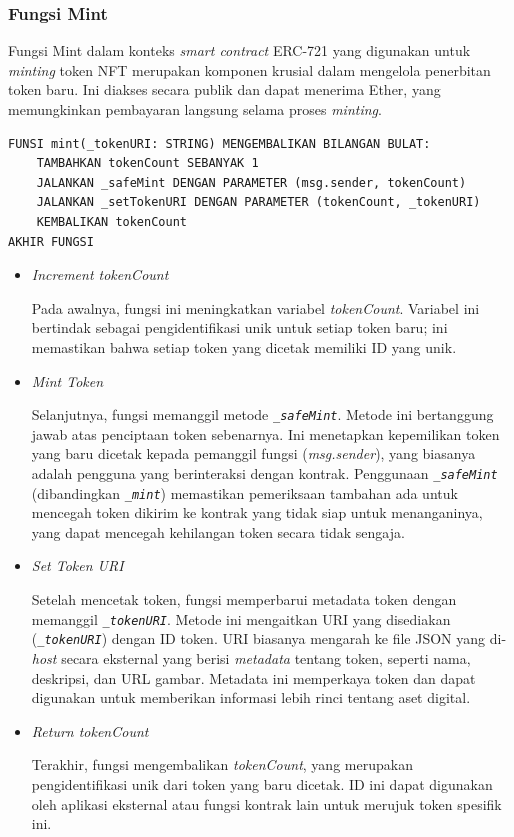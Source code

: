 \subsubsection{Fungsi Mint}
Fungsi Mint dalam konteks \emph{smart contract } ERC-721 yang digunakan untuk \emph{minting} token NFT merupakan komponen krusial dalam mengelola penerbitan token baru. Ini diakses secara publik dan dapat menerima Ether, yang memungkinkan pembayaran langsung selama proses \emph{minting}.

\begin{lstlisting}[caption=Fungsi Mint]
FUNSI mint(_tokenURI: STRING) MENGEMBALIKAN BILANGAN BULAT:
    TAMBAHKAN tokenCount SEBANYAK 1
    JALANKAN _safeMint DENGAN PARAMETER (msg.sender, tokenCount)
    JALANKAN _setTokenURI DENGAN PARAMETER (tokenCount, _tokenURI)
    KEMBALIKAN tokenCount
AKHIR FUNGSI
\end{lstlisting}

\begin{itemize}
    \item \emph{Increment tokenCount}
    
    Pada awalnya, fungsi ini meningkatkan variabel \emph{tokenCount}. Variabel ini bertindak sebagai pengidentifikasi unik untuk setiap token baru; ini memastikan bahwa setiap token yang dicetak memiliki ID yang unik.

    \item \emph{Mint Token}
    
    Selanjutnya, fungsi memanggil metode \emph{\texttt{\_safeMint}}. Metode ini bertanggung jawab atas penciptaan token sebenarnya. Ini menetapkan kepemilikan token yang baru dicetak kepada pemanggil fungsi (\emph{msg.sender}), yang biasanya adalah pengguna yang berinteraksi dengan kontrak. Penggunaan \emph{\texttt{\_safeMint}} (dibandingkan \emph{\texttt{\_mint}}) memastikan pemeriksaan tambahan ada untuk mencegah token dikirim ke kontrak yang tidak siap untuk menanganinya, yang dapat mencegah kehilangan token secara tidak sengaja.

    \item \emph{Set Token URI}
    
    Setelah mencetak token, fungsi memperbarui metadata token dengan memanggil \emph{\texttt{\_tokenURI}}. Metode ini mengaitkan URI yang disediakan (\emph{\texttt{\_tokenURI}}) dengan ID token. URI biasanya mengarah ke file JSON yang di-\emph{host} secara eksternal yang berisi \emph{metadata} tentang token, seperti nama, deskripsi, dan URL gambar. Metadata ini memperkaya token dan dapat digunakan untuk memberikan informasi lebih rinci tentang aset digital.

    \item \emph{Return tokenCount}
    
    Terakhir, fungsi mengembalikan \emph{tokenCount}, yang merupakan pengidentifikasi unik dari token yang baru dicetak. ID ini dapat digunakan oleh aplikasi eksternal atau fungsi kontrak lain untuk merujuk token spesifik ini.
\end{itemize}

